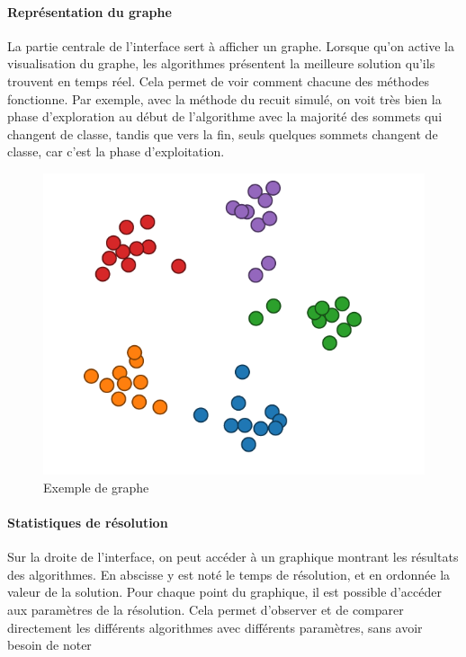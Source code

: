 \documentclass[12pt]{article}
\begin{document}
\paragraph{Représentation du graphe} La partie centrale de l'interface sert à afficher un graphe. Lorsque qu'on active la visualisation du graphe, les algorithmes présentent la meilleure solution qu'ils trouvent en temps réel. Cela permet de voir comment chacune des méthodes fonctionne. Par exemple, avec la méthode du recuit simulé, on voit très bien la phase d'exploration au début de l'algorithme avec la majorité des sommets qui changent de classe, tandis que vers la fin, seuls quelques sommets changent de classe, car c'est la phase d'exploitation.

\begin{figure}[!h]
	\begin{center}
		\includegraphics[scale=0.5]{pictures/exempleGraph.png}
	\end{center}
	\caption{Exemple de graphe \label{fig:graph}}
\end{figure}

\paragraph{Statistiques de résolution} Sur la droite de l'interface, on peut accéder à un graphique montrant les résultats des algorithmes. En abscisse y est noté le temps de résolution, et en ordonnée la valeur de la solution. Pour chaque point du graphique, il est possible d'accéder aux paramètres de la résolution. Cela permet d'observer et de comparer directement les différents algorithmes avec différents paramètres, sans avoir besoin de noter 
\end{document}
